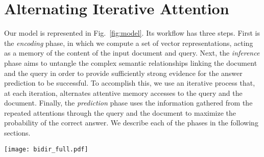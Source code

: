 \documentclass[11pt]{article}
\begin{document}
\section{Alternating Iterative Attention}


Our model is represented in Fig.~\ref{fig:model}. Its workflow has three steps.
First is the \emph{encoding} phase, in which we compute a set of vector representations, acting as a memory of the content of the input document and query.
Next, the \emph{inference} phase aims to untangle the complex semantic relationships linking the document and the query in order to provide sufficiently strong evidence for the answer prediction to be successful.
To accomplish this, we use an iterative process that, at each iteration, alternates attentive memory accesses to the query and the document.
Finally, the \emph{prediction} phase uses the information gathered from the repeated attentions through the query and the document to maximize the probability of the correct answer.
We describe each of the phases in the following sections.



\begin{figure*}[t]
    \centering
    \texttt{[image: bidir\_full.pdf]}
    \caption{Our model first encodes the query and the document by means of bidirectional GRU networks. Then, it deploys an iterative inference mechanism that alternates between attending query encodings (1) and document encodings (2) given the query attended state. The results of the alternating attention is gated and fed back into the inference GRU. Even if the encodings are computed only once, the query representation is dynamic and changes throughout the inference process. After a fixed number of steps $T$, the weights of the document attention are used to estimate the probability of the answer $P(a|\mathcal{Q}, \mathcal{D})$.}
    \label{fig:model}
\end{figure*}
\end{document}
